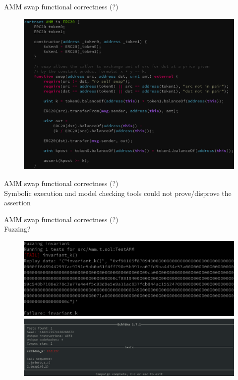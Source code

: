 \documentclass[aspectratio=169,10pt]{beamer}
\begin{document}
\begin{frame}[fragile]
\begin{center}
AMM swap functional correctness (?)
\begin{figure}
	\includegraphics[scale=0.23]{images/amm_fail}
\end{figure}
\end{center}
\end{frame}

\begin{frame}[fragile]
\begin{center}
AMM swap functional correctness (?)\\
Symbolic execution and model checking tools could not prove/disprove the assertion
\end{center}
\end{frame}

\begin{frame}[fragile]
\begin{center}
AMM swap functional correctness (?)\\
Fuzzing?\\
\begin{figure}
\includegraphics[scale=0.2]{images/amm_fail_hevm_run}
\includegraphics[scale=0.2]{images/amm_fail_echidna_run}
\end{figure}
\end{center}
\end{frame}
\end{document}
